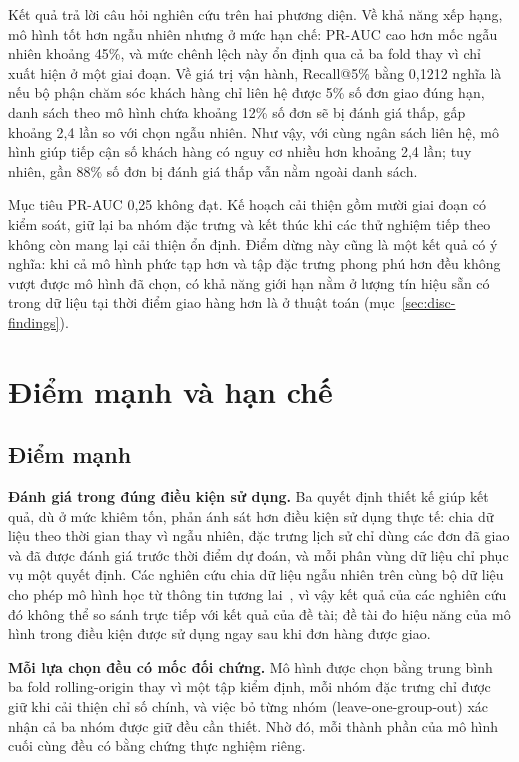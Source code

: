 \documentclass[12pt,a4paper]{report}
\begin{document}
Kết quả trả lời câu hỏi nghiên cứu trên hai phương diện. Về khả năng xếp hạng, mô hình tốt hơn ngẫu nhiên nhưng ở mức hạn chế: PR-AUC cao hơn mốc ngẫu nhiên khoảng 45\%, và mức chênh lệch này ổn định qua cả ba fold thay vì chỉ xuất hiện ở một giai đoạn. Về giá trị vận hành, Recall@5\% bằng 0,1212 nghĩa là nếu bộ phận chăm sóc khách hàng chỉ liên hệ được 5\% số đơn giao đúng hạn, danh sách theo mô hình chứa khoảng 12\% số đơn sẽ bị đánh giá thấp, gấp khoảng 2,4 lần so với chọn ngẫu nhiên. Như vậy, với cùng ngân sách liên hệ, mô hình giúp tiếp cận số khách hàng có nguy cơ nhiều hơn khoảng 2,4 lần; tuy nhiên, gần 88\% số đơn bị đánh giá thấp vẫn nằm ngoài danh sách.

Mục tiêu PR-AUC 0,25 không đạt. Kế hoạch cải thiện gồm mười giai đoạn có kiểm soát, giữ lại ba nhóm đặc trưng và kết thúc khi các thử nghiệm tiếp theo không còn mang lại cải thiện ổn định. Điểm dừng này cũng là một kết quả có ý nghĩa: khi cả mô hình phức tạp hơn và tập đặc trưng phong phú hơn đều không vượt được mô hình đã chọn, có khả năng giới hạn nằm ở lượng tín hiệu sẵn có trong dữ liệu tại thời điểm giao hàng hơn là ở thuật toán (mục~\ref{sec:disc-findings}).

\section{Điểm mạnh và hạn chế}\label{sec:disc-sw}

\subsection{Điểm mạnh}

\textbf{Đánh giá trong đúng điều kiện sử dụng.} Ba quyết định thiết kế giúp kết quả, dù ở mức khiêm tốn, phản ánh sát hơn điều kiện sử dụng thực tế: chia dữ liệu theo thời gian thay vì ngẫu nhiên, đặc trưng lịch sử chỉ dùng các đơn đã giao và đã được đánh giá trước thời điểm dự đoán, và mỗi phân vùng dữ liệu chỉ phục vụ một quyết định. Các nghiên cứu chia dữ liệu ngẫu nhiên trên cùng bộ dữ liệu cho phép mô hình học từ thông tin tương lai~\cite{orman2026}, vì vậy kết quả của các nghiên cứu đó không thể so sánh trực tiếp với kết quả của đề tài; đề tài đo hiệu năng của mô hình trong điều kiện được sử dụng ngay sau khi đơn hàng được giao.

\textbf{Mỗi lựa chọn đều có mốc đối chứng.} Mô hình được chọn bằng trung bình ba fold rolling-origin thay vì một tập kiểm định, mỗi nhóm đặc trưng chỉ được giữ khi cải thiện chỉ số chính, và việc bỏ từng nhóm (leave-one-group-out) xác nhận cả ba nhóm được giữ đều cần thiết. Nhờ đó, mỗi thành phần của mô hình cuối cùng đều có bằng chứng thực nghiệm riêng.
\end{document}
